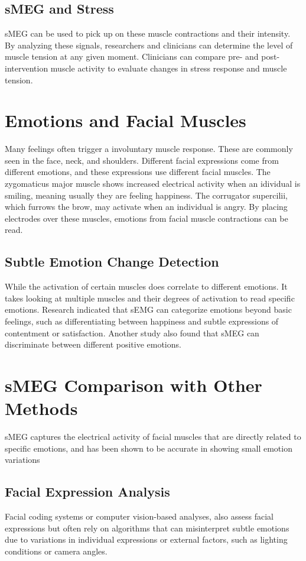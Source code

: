 \documentclass[twocolumn]{article}
\begin{document}
\subsection{sMEG and Stress}
sMEG can be used to pick up on these muscle contractions and their intensity. By analyzing these signals, researchers and clinicians can determine the level of muscle tension at any given moment. Clinicians can compare pre- and post-intervention muscle activity to evaluate changes in stress response and muscle tension. \cite{Blase_Vermetten_Lehrer_Gevirtz_2021}
\section{Emotions and Facial Muscles}
Many feelings often trigger a involuntary muscle response. These are commonly seen in the face, neck, and shoulders. Different facial expressions come from different emotions, and these expressions use different facial muscles. The zygomaticus major muscle shows increased electrical activity when an idividual is smiling, meaning usually they are feeling happiness. The corrugator supercilii, which furrows the brow, may activate when an individual is angry. By placing electrodes over these muscles, emotions from facial muscle contractions can be read. 
\cite{Mamieva_Abdusalomov_Kutlimuratov_Muminov_Whangbo_2023}
\cite{Awana_Singh_Mishra_Bhutani_Kumar_Shrivastava_2023}
\subsection{Subtle Emotion Change Detection}
While the activation of certain muscles does correlate to different emotions. It takes looking at multiple muscles and their degrees of activation to read specific emotions. Research indicated that sEMG can categorize emotions beyond basic feelings, such as differentiating between happiness and subtle expressions of contentment or satisfaction. \cite{Sato_Murata_Uraoka_Shibata_Yoshikawa_2021} Another study also found that sMEG can discriminate between different positive emotions. 
\cite{Diederiks_2021}
\section{sMEG Comparison with Other Methods}
sMEG captures the electrical activity of facial muscles that are directly related to specific emotions, and has been shown to be accurate in showing small emotion variations
\subsection{Facial Expression Analysis}
Facial coding systems or computer vision-based analyses, also assess facial expressions but often rely on algorithms that can misinterpret subtle emotions due to variations in individual expressions or external factors, such as lighting conditions or camera angles. \cite{Künecke_Hildebrandt_Recio_Sommer_2014}
\end{document}

